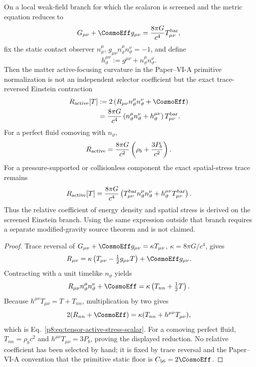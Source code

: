 \documentclass[12pt,a4paper]{article}
\begin{document}
\begin{lemma}
\label{p8:lem:active-stress-selector-scalar}
On a local weak-field branch for which the scalaron is screened and the metric
equation reduces to
\begin{equation}
G_{\mu\nu}+\CosmoEff g_{\mu\nu}=\frac{8\pi G}{c^4}T^{\rm bar}_{\mu\nu},
\end{equation}
fix the static contact observer \(n_\vartheta^\mu\),
\(g_{\mu\nu}n_\vartheta^\mu n_\vartheta^\nu=-1\), and define
\begin{equation}
\label{p8:eq:contact-spatial-projector}
h_\vartheta^{\mu\nu}:=g^{\mu\nu}+n_\vartheta^\mu n_\vartheta^\nu.
\end{equation}
Then the matter active-focusing curvature in the Paper--VI-A primitive
normalization is not an independent selector coefficient but the exact
trace-reversed Einstein contraction
\begin{align}
\label{p8:eq:tensor-active-stress-scalar}
R_{\rm active}[T]
&:=2\left(R_{\mu\nu}n_\vartheta^\mu n_\vartheta^\nu+\CosmoEff\right)\\
&=\frac{8\pi G}{c^4}
\left(n_\vartheta^\mu n_\vartheta^\nu+h_\vartheta^{\mu\nu}\right)
T^{\rm bar}_{\mu\nu}.
\end{align}
For a perfect fluid comoving with \(n_\vartheta\),
\begin{equation}
\label{p8:eq:active-stress-scalar-leading}
R_{\rm active}
=\frac{8\pi G}{c^2}
\left(\rho_b+\frac{3P_b}{c^2}\right).
\end{equation}
For a pressure-supported or collisionless component the exact spatial-stress
trace remains
\begin{equation}
\label{p8:eq:active-stress-general-spatial-trace}
R_{\rm active}[T]
=\frac{8\pi G}{c^4}
\left(T^{\rm bar}_{\mu\nu}n_\vartheta^\mu n_\vartheta^\nu
+h_\vartheta^{\mu\nu}T^{\rm bar}_{\mu\nu}\right).
\end{equation}
Thus the relative coefficient of energy density and spatial stress is derived
on the screened Einstein branch.  Using the same expression outside that
branch requires a separate modified-gravity source theorem and is not claimed.
\end{lemma}

\begin{proof}
Trace reversal of
\(G_{\mu\nu}+\CosmoEff g_{\mu\nu}=\kappa T_{\mu\nu}\),
\(\kappa=8\pi G/c^4\), gives
\[
R_{\mu\nu}=\kappa\left(T_{\mu\nu}-\tfrac12g_{\mu\nu}T\right)
+\CosmoEff g_{\mu\nu}.
\]
Contracting with a unit timelike \(n_\vartheta\) yields
\[
R_{\mu\nu}n_\vartheta^\mu n_\vartheta^\nu+\CosmoEff
=\kappa\left(T_{nn}+\tfrac12T\right).
\]
Because \(h^{\mu\nu}T_{\mu\nu}=T+T_{nn}\), multiplication by two gives
\[
2(R_{nn}+\CosmoEff)=\kappa(T_{nn}+h^{\mu\nu}T_{\mu\nu}),
\]
which is Eq.~\eqref{p8:eq:tensor-active-stress-scalar}.  For a comoving perfect
fluid, \(T_{nn}=\rho_b c^2\) and
\(h^{\mu\nu}T_{\mu\nu}=3P_b\), proving the displayed reduction.  No relative
coefficient has been selected by hand; it is fixed by trace reversal and the
Paper--VI-A convention that the primitive static floor is \(C_{56}=2\CosmoEff\).
\end{proof}
\end{document}
